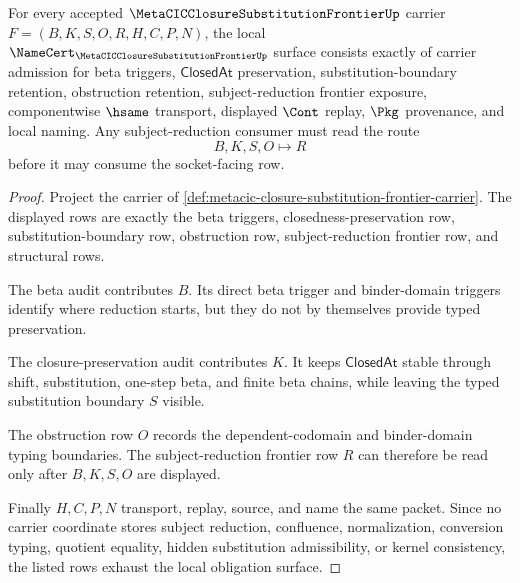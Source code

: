 \begin{theorem}
\label{thm:metacic-closure-substitution-frontier-namecert-obligations}
For every accepted $\MetaCICClosureSubstitutionFrontierUp$ carrier $F=(B,K,S,O,R,H,C,P,N)$, the local $\NameCert_{\MetaCICClosureSubstitutionFrontierUp}$ surface consists exactly of carrier admission for beta triggers, $\mathsf{ClosedAt}$ preservation, substitution-boundary retention, obstruction retention, subject-reduction frontier exposure, componentwise $\hsame$ transport, displayed $\Cont$ replay, $\Pkg$ provenance, and local naming. Any subject-reduction consumer must read the route
$$
B,K,S,O \longmapsto R
$$
before it may consume the socket-facing row.
\end{theorem}
\begin{proof}
Project the carrier of \autoref{def:metacic-closure-substitution-frontier-carrier}. The displayed rows are exactly the beta triggers, closedness-preservation row, substitution-boundary row, obstruction row, subject-reduction frontier row, and structural rows.

The beta audit contributes $B$. Its direct beta trigger and binder-domain triggers identify where reduction starts, but they do not by themselves provide typed preservation.

The closure-preservation audit contributes $K$. It keeps $\mathsf{ClosedAt}$ stable through shift, substitution, one-step beta, and finite beta chains, while leaving the typed substitution boundary $S$ visible.

The obstruction row $O$ records the dependent-codomain and binder-domain typing boundaries. The subject-reduction frontier row $R$ can therefore be read only after $B,K,S,O$ are displayed.

Finally $H,C,P,N$ transport, replay, source, and name the same packet. Since no carrier coordinate stores subject reduction, confluence, normalization, conversion typing, quotient equality, hidden substitution admissibility, or kernel consistency, the listed rows exhaust the local obligation surface.
\end{proof}


